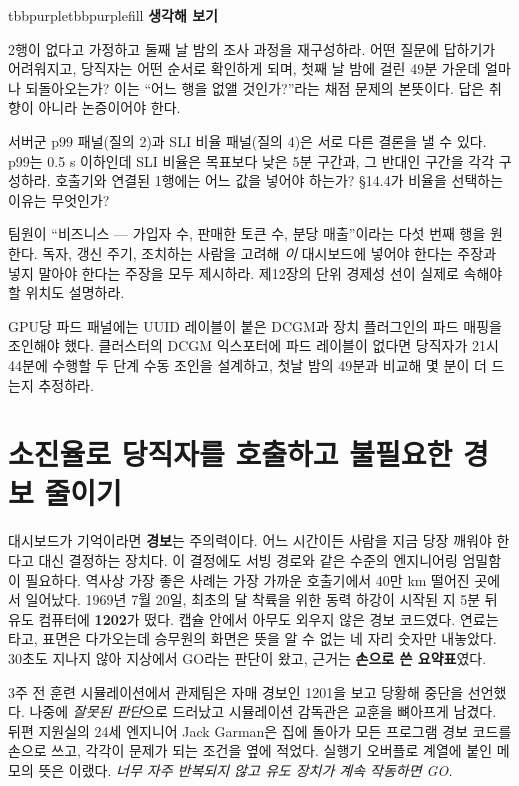 \begin{calloutbox}{tbbpurple}{tbbpurplefill}
{\normalsize\bfseries\color{tbbpurple}생각해 보기}\par\vspace{3pt}
\begin{tbbitemize}
  \item 2행이 없다고 가정하고 둘째 날 밤의 조사 과정을 재구성하라. 어떤 질문에 답하기가 어려워지고, 당직자는 어떤 순서로 확인하게 되며, 첫째 날 밤에 걸린 49분 가운데 얼마나 되돌아오는가? 이는 “어느 행을 없앨 것인가?”라는 채점 문제의 본뜻이다. 답은 취향이 아니라 논증이어야 한다.
  \item 서버군 p99 패널(질의 2)과 SLI 비율 패널(질의 4)은 서로 다른 결론을 낼 수 있다. p99는 0.5 s 이하인데 SLI 비율은 목표보다 낮은 5분 구간과, 그 반대인 구간을 각각 구성하라. 호출기와 연결된 1행에는 어느 값을 넣어야 하는가? §14.4가 비율을 선택하는 이유는 무엇인가?
  \item 팀원이 “비즈니스 — 가입자 수, 판매한 토큰 수, 분당 매출”이라는 다섯 번째 행을 원한다. 독자, 갱신 주기, 조치하는 사람을 고려해 \textit{이} 대시보드에 넣어야 한다는 주장과 넣지 말아야 한다는 주장을 모두 제시하라. 제12장의 단위 경제성 선이 실제로 속해야 할 위치도 설명하라.
  \item GPU당 파드 패널에는 UUID 레이블이 붙은 DCGM과 장치 플러그인의 파드 매핑을 조인해야 했다. 클러스터의 DCGM 익스포터에 파드 레이블이 없다면 당직자가 21시 44분에 수행할 두 단계 수동 조인을 설계하고, 첫날 밤의 49분과 비교해 몇 분이 더 드는지 추정하라.
\end{tbbitemize}
\end{calloutbox}

\section{소진율로 당직자를 호출하고 불필요한 경보 줄이기}

대시보드가 기억이라면 \textbf{경보}는 주의력이다. 어느 시간이든 사람을 지금 당장 깨워야 한다고 대신 결정하는 장치다. 이 결정에도 서빙 경로와 같은 수준의 엔지니어링 엄밀함이 필요하다. 역사상 가장 좋은 사례는 가장 가까운 호출기에서 40만 km 떨어진 곳에서 일어났다. 1969년 7월 20일, 최초의 달 착륙을 위한 동력 하강이 시작된 지 5분 뒤 유도 컴퓨터에 \textbf{1202}가 떴다. 캡슐 안에서 아무도 외우지 않은 경보 코드였다. 연료는 타고, 표면은 다가오는데 승무원의 화면은 뜻을 알 수 없는 네 자리 숫자만 내놓았다. 30초도 지나지 않아 지상에서 GO라는 판단이 왔고, 근거는 \textbf{손으로 쓴 요약표}였다.

3주 전 훈련 시뮬레이션에서 관제팀은 자매 경보인 1201을 보고 당황해 중단을 선언했다. 나중에 \textit{잘못된 판단}으로 드러났고 시뮬레이션 감독관은 교훈을 뼈아프게 남겼다. 뒤편 지원실의 24세 엔지니어 Jack Garman은 집에 돌아가 모든 프로그램 경보 코드를 손으로 쓰고, 각각이 문제가 되는 조건을 옆에 적었다. 실행기 오버플로 계열에 붙인 메모의 뜻은 이랬다. \textit{너무 자주 반복되지 않고 유도 장치가 계속 작동하면 GO.}

